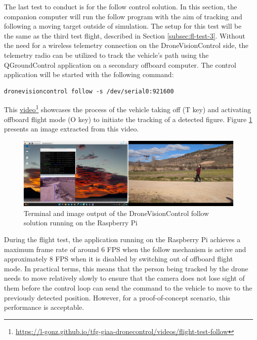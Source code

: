 The last test to conduct is for the follow control solution. In this section, the companion computer will run the follow program with the aim of tracking and following a moving target outside of simulation. The setup for this test will be the same as the third test flight, described in Section \ref{subsec:fl-test-3}. Without the need for a wireless telemetry connection on the DroneVisionControl side, the telemetry radio can be utilized to track the vehicle's path using the QGroundControl application on a secondary offboard computer. The control application will be started with the following command:
\begin{verbatim}
dronevisioncontrol follow -s /dev/serial0:921600
\end{verbatim}
This \href{https://l-gonz.github.io/tfg-giaa-dronecontrol/videos/flight-test-follow}{video}\footnote{\url{https://l-gonz.github.io/tfg-giaa-dronecontrol/videos/flight-test-follow}} showcases the process of the vehicle taking off (T key) and activating offboard flight mode (O key) to initiate the tracking of a detected figure. Figure \ref{fig:flight-test-follow} presents an image extracted from this video.


\begin{figure}
  \centering
  \includegraphics[width=\textwidth, keepaspectratio]{img/video-field-test-follow.png}
  \caption{Terminal and image output of the DroneVisionControl follow solution running on the Raspberry Pi}
  \label{fig:flight-test-follow}
\end{figure}


During the flight test, the application running on the Raspberry Pi achieves a maximum frame rate of around 6 FPS when the follow mechanism is active and approximately 8 FPS when it is disabled by switching out of offboard flight mode. In practical terms, this means that the person being tracked by the drone needs to move relatively slowly to ensure that the camera does not lose sight of them before the control loop can send the command to the vehicle to move to the previously detected position. However, for a proof-of-concept scenario, this performance is acceptable.


